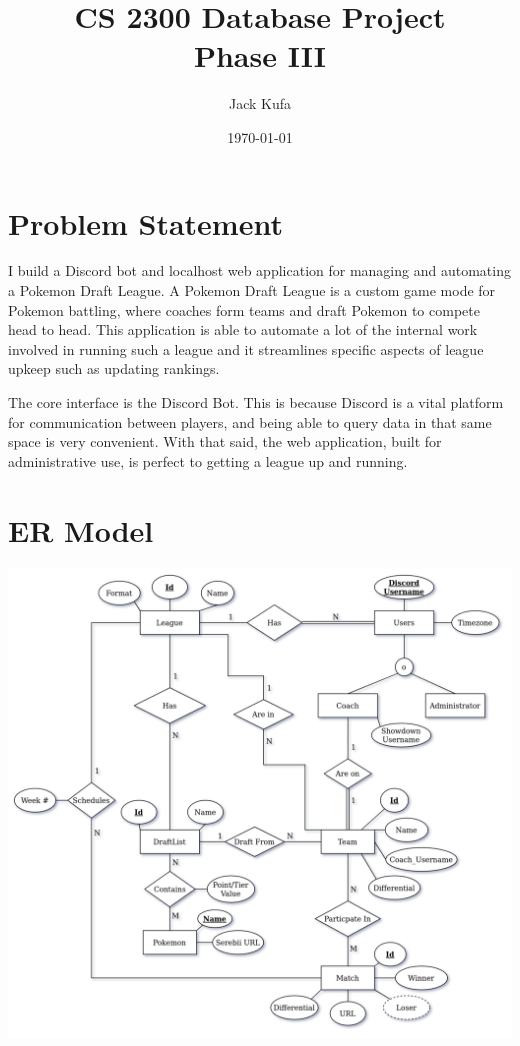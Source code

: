 \documentclass{article}
\title{CS 2300 Database Project \\ Phase III}
\author{Jack Kufa}
\date{\today}
\begin{document}
\maketitle

\section*{Problem Statement}
I build a Discord bot and localhost web application for managing and automating a Pokemon Draft League. A Pokemon Draft League is a custom game mode
for Pokemon battling, where coaches form teams and draft Pokemon to compete head to head. This application is able to automate 
a lot of the internal work involved in running such a league and it streamlines specific aspects of league upkeep such as updating rankings.

The core interface is the Discord Bot. 
This is because Discord is a vital platform for communication between players, and being able to query data in that same space is very convenient. 
With that said, the web application, built for administrative use, is perfect to getting a league up and running.

\section*{ER Model}
\includegraphics[scale=.35]{PokemonDraftLeagueDB_final.png}
\end{document}
